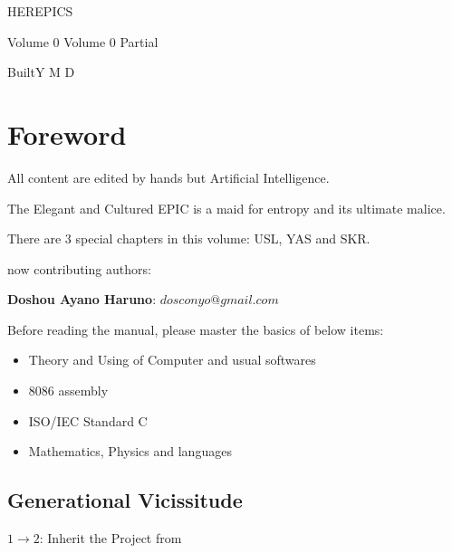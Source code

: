 \begin{sloppypar}
\author{dosconio}
{
\begin{center}
	{
	\fontsize{48pt}{0}\selectfont\textcolor[rgb]{1, 0, 0.618}{HEREPICS}}
\end{center}
}
\ifdetail{}
{\hfill\sc\fontsize{24pt}{0}\selectfont\textcolor[rgb]{1, 0, 0.618}{Volume 0}}
\else
{\hfill\sc\fontsize{24pt}{0}\selectfont\textcolor[rgb]{1, 0, 0.618}{Volume 0} Partial}
\fi

{\hfill\sc\fontsize{24pt}{0}\selectfont\textcolor[rgb]{1, 0, 0.618}{BuiltY\number\year{} M\number\month{} D\number\day{}}}


\renewcommand{\contentsname}{Contents}
\newpage %
\setcounter{tocdepth}{3}
\tableofcontents

\section{Foreword} %

All content\cite{HEREPIC} are edited by hands but Artificial Intelligence.

The Elegant and Cultured EPIC is a maid for entropy and its ultimate malice.

There are 3 special chapters in this volume: USL, YAS and SKR.

now contributing authors:

\textbf{Doshou Ayano Haruno}: 
$dosconyo@gmail.com$

Before reading the manual, please master the basics of below items:
\begin{itemize}
	\item Theory and Using of Computer and usual softwares 
	\item 8086 assembly
	\item ISO/IEC Standard C
	\item Mathematics, Physics and languages
\end{itemize}

\subsection{Generational Vicissitude}

$1 \rightarrow 2$: Inherit the Project from 


\end{sloppypar}
